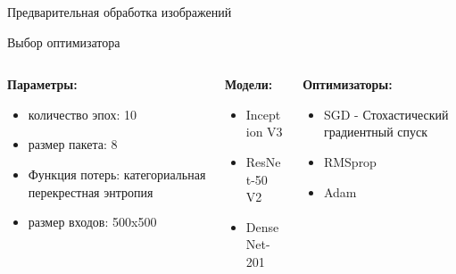 \documentclass[aspectratio=169]{beamer}
\begin{document}
\begin{frame}{Предварительная обработка изображений}
    
\end{frame}

\begin{frame}{Выбор оптимизатора}
    \begin{columns}[T]
        \begin{column}{.3\paperwidth}
            \textbf{Параметры:}
            \begin{itemize}
                \item количество эпох: 10
                \item размер пакета: 8 
                \item Функция потерь: категориальная перекрестная энтропия 
                \item размер входов: 500x500
            \end{itemize}
        \end{column}
        \begin{column}{.2\paperwidth}
            \textbf{Модели:}            
            \begin{itemize}
                \item Inception V3
                \item ResNet-50 V2
                \item DenseNet-201
            \end{itemize} 
        \end{column}
        \begin{column}{.3\paperwidth}
            \textbf{Оптимизаторы:}
            \begin{itemize}
                \item SGD - Стохастический градиентный спуск
                \item RMSprop
                \item Adam
            \end{itemize} 
        \end{column}
    \end{columns}    
\end{frame}
\end{document}
